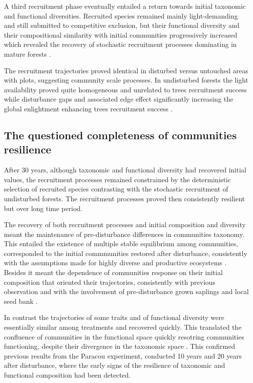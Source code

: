 \documentclass[fleqn,10pt]{ArtEcoFoG} %
\begin{document}
A third recruitment phase eventually entailed a return towards initial
taxonomic and functional diversities. Recruited species remained mainly
light-demanding and still submitted to competitive exclusion, but their
functional diversity and their compositional similarity with initial
communities progressively increased which revealed the recovery of
stochastic recruitment processes dominating in mature forests
\citep{Lawton1988, Mayfield2010}.

The recruitment trajectories proved identical in disturbed versus
untouched areas with plots, suggesting community scale processes. In
undisturbed forests the light availability proved quite homogeneous and
unrelated to trees recruitment success \citep{Dalling2002} while
disturbance gaps and associated edge effect significantly increasing the
global enlightment enhancing trees recruitment success
\citep{Ruger2009}.

\subsection{The questioned completeness of communities
resilience}\label{the-questioned-completeness-of-communities-resilience}

After 30 years, although taxonomic and functional diversity had
recovered initial values, the recruitment processes remained constrained
by the deterministic selection of recruited species contrasting with the
stochastic recruitment of undisturbed forests. The recruitment processes
proved then consistently resilient but over long time period.

The recovery of both recruitment processes and initial composition and
diversity meant the maintenance of pre-disturbance differences in
communities taxonomy. This entailed the existence of multiple stable
equilibrium among communities, corresponded to the initial commmunities
restored after disturbance, consistently with the assumptions made for
highly diverse and productive ecosystems \citep{Chase2003}. Besides it
meant the dependence of communities response on their initial
composition that oriented their trajectories, consistently with previous
observation and with the involvement of pre-disturbance grown saplings
and local seed bank \citep{Dalling2002, Anderson2007}.

In contrast the trajectories of some traits and of functional diversity
were essentially similar among treatments and recovered quickly. This
translated the confluence of communities in the functional space quickly
resotring communities functioning, despite their divergence in the
taxonomic space \citep{Fukami2005}. This confirmed previous results from
the Paracou experiment, conducted 10 years \citep{Molino2001} and 20
years \citep{Baraloto2012a} after disturbance, where the early signs of
the resilience of taxonomic and functional composition had been
detected.
\end{document}
